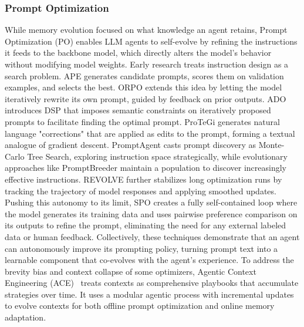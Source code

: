 \documentclass[10pt]{article} %
\begin{document}
\subsubsection{Prompt Optimization}
While memory evolution focused on what knowledge an agent retains, Prompt Optimization (PO) enables LLM agents to self-evolve by refining the instructions it feeds to the backbone model, which directly alters the model's behavior without modifying model weights\citep{ramnath2025systematic}. Early research treats instruction design as a search problem. APE\citep{zhou2022large} generates candidate prompts, scores them on validation examples, and selects the best. ORPO\citep{yang2023large} extends this idea by letting the model iteratively rewrite its own prompt, guided by feedback on prior outputs. ADO\citep{lin2025ado} introduces DSP that imposes semantic constraints on iteratively proposed prompts to facilitate finding the optimal prompt. ProTeGi\citep{pryzant2023automatic} generates natural language "corrections" that are applied as edits to the prompt, forming a textual analogue of gradient descent. PromptAgent\citep{wang2023promptagent} casts prompt discovery as Monte-Carlo Tree Search, exploring instruction space strategically, while evolutionary approaches like PromptBreeder\citep{fernando2023promptbreeder} maintain a population to discover increasingly effective instructions. REVOLVE\citep{zhang2024revolve} further stabilizes long optimization runs by tracking the trajectory of model responses and applying smoothed updates. Pushing this autonomy to its limit, SPO\citep{xiang2025self} creates a fully self-contained loop where the model generates its training data and uses pairwise preference comparison on its outputs to refine the prompt, eliminating the need for any external labeled data or human feedback. Collectively, these techniques demonstrate that an agent can autonomously improve its prompting policy, turning prompt text into a learnable component that co-evolves with the agent’s experience. To address the brevity bias and context collapse of some optimizers, Agentic Context Engineering (ACE)~\citep{zhang2025ACE} treats contexts as comprehensive playbooks that accumulate strategies over time. It uses a modular agentic process with incremental updates to evolve contexts for both offline prompt optimization and online memory adaptation.
\end{document}
